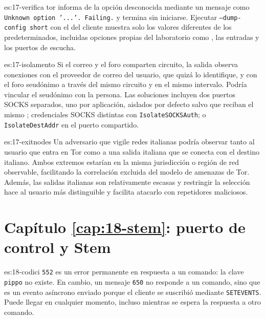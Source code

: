 \begin{soluzione}{es:17-verifica}
tor informa de la opción desconocida mediante un mensaje como \texttt{Unknown option '...'. Failing.} y termina sin iniciarse. Ejecutar \texttt{--dump-config short} con el  del cliente muestra solo los valores diferentes de los predeterminados, incluidas opciones propias del laboratorio como , las entradas  y los puertos de escucha.
\end{soluzione}

\begin{soluzione}{es:17-isolamento}
Si el correo y el foro comparten circuito, la salida observa conexiones con el proveedor de correo del usuario, que quizá lo identifique, y con el foro seudónimo a través del mismo circuito y en el mismo intervalo. Podría vincular el seudónimo con la persona. Las soluciones incluyen dos puertos SOCKS separados, uno por aplicación, aislados por defecto salvo que reciban el mismo ; credenciales SOCKS distintas con \texttt{IsolateSOCKSAuth}; o \texttt{IsolateDestAddr} en el puerto compartido.
\end{soluzione}

\begin{soluzione}{es:17-exitnodes}
Un adversario que vigile redes italianas podría observar tanto al usuario que entra en Tor como a una salida italiana que se conecta con el destino italiano. Ambos extremos estarían en la misma jurisdicción o región de red observable, facilitando la correlación excluida del modelo de amenazas de Tor. Además, las salidas italianas son relativamente escasas y restringir la selección hace al usuario más distinguible y facilita atacarlo con repetidores maliciosos.
\end{soluzione}

\section*{Capítulo \ref{cap:18-stem}: puerto de control y Stem}

\begin{soluzione}{es:18-codici}
\texttt{552} es un error permanente en respuesta a un comando: la clave \texttt{pippo} no existe. En cambio, un mensaje \texttt{650} no responde a un comando, sino que es un evento asíncrono enviado porque el cliente se suscribió mediante \texttt{SETEVENTS}. Puede llegar en cualquier momento, incluso mientras se espera la respuesta a otro comando.
\end{soluzione}

